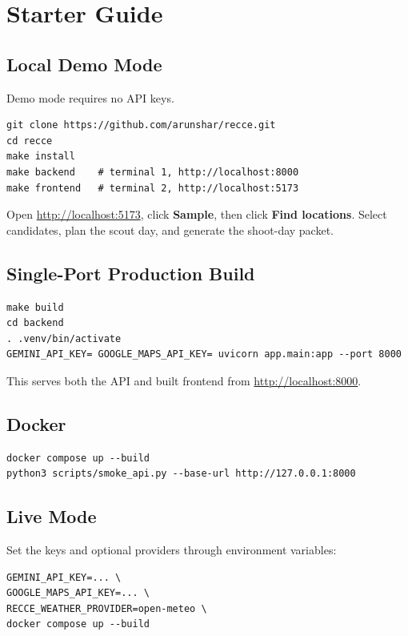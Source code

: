 \documentclass[11pt]{article}
\begin{document}
\section{Starter Guide}

\subsection{Local Demo Mode}

Demo mode requires no API keys.

\begin{lstlisting}
git clone https://github.com/arunshar/recce.git
cd recce
make install
make backend    # terminal 1, http://localhost:8000
make frontend   # terminal 2, http://localhost:5173
\end{lstlisting}

Open \url{http://localhost:5173}, click \textbf{Sample}, then click
\textbf{Find locations}. Select candidates, plan the scout day, and generate the
shoot-day packet.

\subsection{Single-Port Production Build}

\begin{lstlisting}
make build
cd backend
. .venv/bin/activate
GEMINI_API_KEY= GOOGLE_MAPS_API_KEY= uvicorn app.main:app --port 8000
\end{lstlisting}

This serves both the API and built frontend from \url{http://localhost:8000}.

\subsection{Docker}

\begin{lstlisting}
docker compose up --build
python3 scripts/smoke_api.py --base-url http://127.0.0.1:8000
\end{lstlisting}

\subsection{Live Mode}

Set the keys and optional providers through environment variables:

\begin{lstlisting}
GEMINI_API_KEY=... \
GOOGLE_MAPS_API_KEY=... \
RECCE_WEATHER_PROVIDER=open-meteo \
docker compose up --build
\end{lstlisting}
\end{document}
